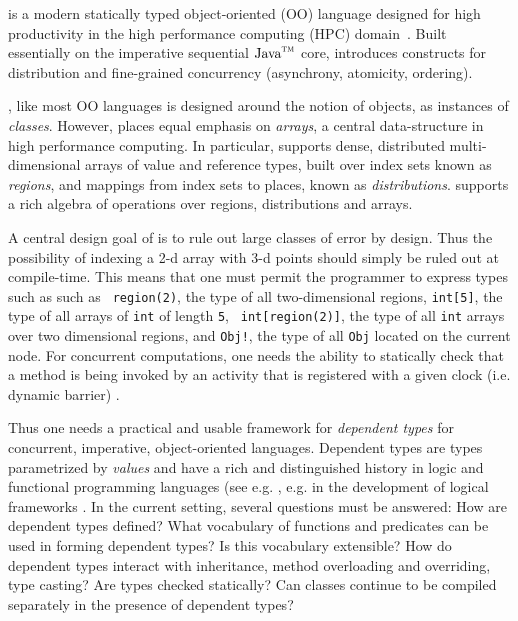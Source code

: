 
%

%
%
%

\Xten{} is a modern statically typed object-oriented (OO) language
designed for high productivity in the high performance computing (HPC)
domain~\cite{X10}. Built essentially on the imperative sequential
$\mbox{Java}^{\mbox{\scriptsize\sc tm}}$ core, \Xten{} introduces constructs for
distribution and fine-grained concurrency (asynchrony, atomicity,
ordering).

\Xten{}, like most OO languages is designed around
the notion of objects, as instances of {\em classes}. However, \Xten{}
places equal emphasis on {\em arrays}, a central data-structure in
high performance computing. In particular, \Xten{} supports dense,
distributed multi-dimensional arrays of value and reference types,
built over index sets known as {\em regions}, and mappings from index
sets to places, known as {\em distributions}.  \Xten{} supports a rich
algebra of operations over regions, distributions and arrays.

A central design goal of \Xten{} is to rule out large classes of error
by design. Thus the possibility of indexing a 2-d array with 3-d
points should simply be ruled out at compile-time. This means that one
must permit the programmer to express types such as such as {\tt
region(2)}, the type of all two-dimensional regions, {\tt int[5]}, the
type of all arrays of {\tt int} of length {\tt 5}, {\tt
int[region(2)]}, the type of all {\tt int} arrays over two dimensional
regions, and {\tt Obj!}, the type of all {\tt Obj} located on the
current node. For concurrent computations, one needs the ability to
statically check that a method is being invoked by an activity that is
registered with a given clock (i.e.{} dynamic barrier) \cite{X10}.

Thus one needs a practical and usable framework for {\em dependent
types} for concurrent, imperative, object-oriented
languages. Dependent types are types parametrized by {\em values}
\cite{dependent-types}  and have a rich and distinguished history in
logic and functional programming languages (see e.g.{}
\cite{xi99dependent,ocrz-ecoop03,aspinall-attapl,cayenne,epigram-matter}, 
e.g.{} in the development of logical frameworks
\cite{calc-constructions}.  In the current setting, several questions
must be answered: How are dependent types defined? What vocabulary of
functions and predicates can be used in forming dependent types? Is
this vocabulary extensible?  How do dependent types interact with
inheritance, method overloading and overriding, type casting? Are
types checked statically? Can classes continue to be compiled separately in the presence of dependent types?

